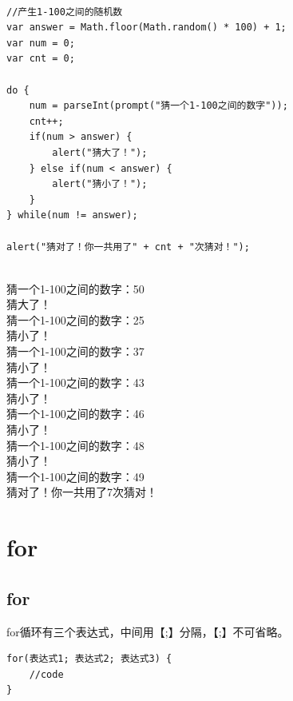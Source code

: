  \\

\begin{lstlisting}[style=htmlcssjs]
//产生1-100之间的随机数
var answer = Math.floor(Math.random() * 100) + 1;
var num = 0;
var cnt = 0;

do {
    num = parseInt(prompt("猜一个1-100之间的数字"));
    cnt++;
    if(num > answer) {
        alert("猜大了！");
    } else if(num < answer) {
        alert("猜小了！");
    }
} while(num != answer);

alert("猜对了！你一共用了" + cnt + "次猜对！");
\end{lstlisting}

\begin{tcolorbox}
	 \\
	猜一个1-100之间的数字：50 \\
	猜大了！ \\
	猜一个1-100之间的数字：25 \\
	猜小了！ \\
	猜一个1-100之间的数字：37 \\
	猜小了！ \\
	猜一个1-100之间的数字：43 \\
	猜小了！ \\
	猜一个1-100之间的数字：46 \\
	猜小了！ \\
	猜一个1-100之间的数字：48 \\
	猜小了！ \\
	猜一个1-100之间的数字：49 \\
	猜对了！你一共用了7次猜对！
\end{tcolorbox}

\newpage

\section{for}

\subsection{for}

for循环有三个表达式，中间用【;】分隔，【;】不可省略。 \\

\begin{lstlisting}[style=htmlcssjs]
for(表达式1; 表达式2; 表达式3) {
    //code
}
\end{lstlisting}

